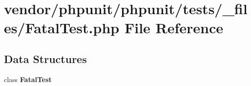 \section{vendor/phpunit/phpunit/tests/\+\_\+files/\+Fatal\+Test.php File Reference}
\label{_fatal_test_8php}
\subsection*{Data Structures}
\begin{DoxyCompactItemize}
\item 
class {\bf Fatal\+Test}
\end{DoxyCompactItemize}
